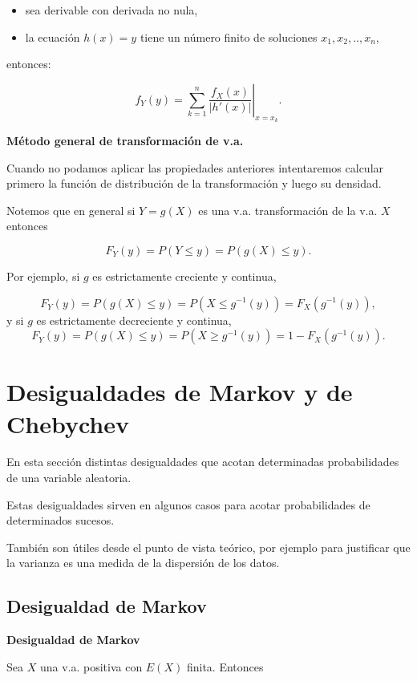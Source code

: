 \documentclass[]{book}
\providecommand{\tightlist}{%
  \setlength{\itemsep}{0pt}\setlength{\parskip}{0pt}}
\begin{document}
\begin{itemize}
\tightlist
\item
  sea derivable con derivada no nula,
\item
  la ecuación \(h(x)=y\) tiene un número finito de soluciones
  \(x_1,x_2,..,x_{n}\),
\end{itemize}

entonces:

\[
\displaystyle f_{Y}(y)=\left.\sum_{k=1}^{n} \frac{f_{X}(x)}
{\left|h'(x)\right|}\right|_{x=x_{k}}.
\]

\textbf{Método general de transformación de v.a.}

Cuando no podamos aplicar las propiedades anteriores intentaremos
calcular primero la función de distribución de la transformación
y luego su densidad.

Notemos que en general si \(Y=g(X)\) es una v.a. transformación de la
v.a. \(X\) entonces

\[
F_{Y}(y)=P(Y\leq y)=P(g(X)\leq y).
\]

Por ejemplo, si \(g\) es estrictamente creciente y continua,

\[
F_{Y}(y)=P(g(X)\leq y)=P(X\leq g^{-1}(y))=F_{X}(g^{-1}(y)),
\]
y si \(g\) es estrictamente decreciente y continua,
\[
F_{Y}(y)=P(g(X)\leq y)=P(X\geq g^{-1}(y))=1-F_{X}(g^{-1}(y)).
\]

\hypertarget{desigualdades-de-markov-y-de-chebychev}{%
\section{Desigualdades de Markov y de Chebychev}\label{desigualdades-de-markov-y-de-chebychev}}

En esta sección distintas desigualdades que acotan determinadas probabilidades de
una variable aleatoria.

Estas desigualdades sirven en algunos casos para acotar probabilidades de determinados sucesos.

También son útiles desde el punto de vista teórico, por ejemplo para justificar que la varianza es una medida de la dispersión de
los datos.

\hypertarget{desigualdad-de-markov}{%
\subsection{Desigualdad de Markov}\label{desigualdad-de-markov}}

\textbf{Desigualdad de Markov}

Sea \(X\) una v.a. positiva con \(E(X)\) finita. Entonces
\end{document}
